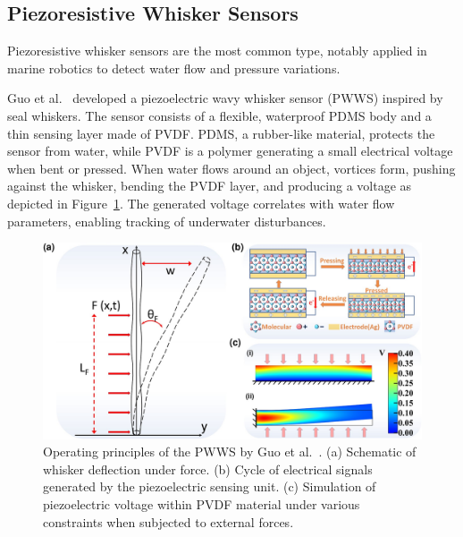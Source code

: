 \subsection{Piezoresistive Whisker Sensors}
Piezoresistive whisker sensors are the most common type, notably applied in marine robotics to detect water flow and pressure variations.

Guo et al.~\cite{GUO2024114875} developed a piezoelectric wavy whisker sensor (PWWS) inspired by seal whiskers.
The sensor consists of a flexible, waterproof PDMS body and a thin sensing layer made of PVDF.
PDMS, a rubber-like material, protects the sensor from water, while PVDF is a polymer generating a small electrical voltage when bent or pressed.
When water flows around an object, vortices form, pushing against the whisker, bending the PVDF layer, and producing a voltage as depicted in Figure~\ref{fig:piezoelectric-whisker}.
The generated voltage correlates with water flow parameters, enabling tracking of underwater disturbances.

\begin{figure}[htb]
    \centering
    \includegraphics[width=\textwidth]{figures/piezoelectric-whisker}
    \caption{Operating principles of the PWWS by Guo et al.~\cite{GUO2024114875}. (a) Schematic of whisker deflection under force. (b) Cycle of electrical signals generated by the piezoelectric sensing unit. (c) Simulation of piezoelectric voltage within PVDF material under various constraints when subjected to external forces.}
    \label{fig:piezoelectric-whisker}
\end{figure}

